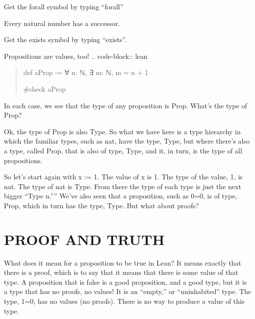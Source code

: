 \documentclass[letterpaper,10pt,english]{sphinxmanual}
\begin{document}
Get the forall symbol by typing “forall”

Every natural number has a successor.

\begin{sphinxVerbatim}[commandchars=\\\{\}]
           

      
\end{sphinxVerbatim}

Get the exists symbol by typing “exists”.

Propositions are values, too!
.. code-block:: lean
\begin{quote}

def aProp := ∀ n: ℕ, ∃ m: ℕ, m = n + 1

\#check aProp
\end{quote}

In each case, we see that the type of any proposition is Prop. What’s
the type of Prop?

\begin{sphinxVerbatim}[commandchars=\\\{\}]
 
\end{sphinxVerbatim}

Ok, the type of Prop is also Type. So what we have here is a type
hierarchy in which the familiar types, such as nat, have the type,
Type, but where there’s also a type, called Prop, that is also of
type, Type, and it, in turn, is the type of all propositions.

So let’s start again with x := 1. The value of x is 1. The type of the
value, 1, is nat.  The type of nat is Type. From there the type of
each type is just the next bigger “Type n.””  We’ve also seen that a
proposition, such as 0=0, is of type, Prop, which in turn has the
type, Type. But what about proofs?


\section{PROOF AND TRUTH}
\label{\detokenize{15-proofs:proof-and-truth}}
What does it mean for a proposition to be true in Lean? It means
exactly that there is a proof, which is to say that it means that
there is some value of that type. A proposition that is false is a
good proposition, and a good type, but it is a type that has no
proofs, no values! It is an “empty,” or “uninhabited” type. The type,
1=0, has no values (no proofs). There is no way to produce a value of
this type.
\end{document}
